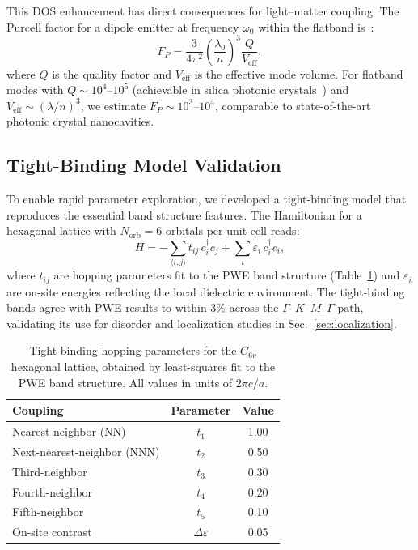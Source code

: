 \documentclass[10pt,letterpaper]{article}
\begin{document}
This DOS enhancement has direct consequences for light--matter coupling. The Purcell factor for a dipole emitter at frequency $\omega_0$ within the flatband is~\cite{Akahane2003}:
\begin{equation}
F_P = \frac{3}{4\pi^2}\left(\frac{\lambda_0}{n}\right)^3 \frac{Q}{V_\mathrm{eff}},
\label{eq:purcell}
\end{equation}
where $Q$ is the quality factor and $V_\mathrm{eff}$ is the effective mode volume. For flatband modes with $Q \sim 10^4$--$10^5$ (achievable in silica photonic crystals~\cite{Akahane2003,Vuckovic2002}) and $V_\mathrm{eff} \sim (\lambda/n)^3$, we estimate $F_P \sim 10^3$--$10^4$, comparable to state-of-the-art photonic crystal nanocavities.

\subsection{Tight-Binding Model Validation}

To enable rapid parameter exploration, we developed a tight-binding model that reproduces the essential band structure features. The Hamiltonian for a hexagonal lattice with $N_\mathrm{orb} = 6$ orbitals per unit cell reads:
\begin{equation}
H = -\sum_{\langle i,j \rangle} t_{ij}\,c_i^\dagger c_j + \sum_i \varepsilon_i\,c_i^\dagger c_i,
\label{eq:tightbinding}
\end{equation}
where $t_{ij}$ are hopping parameters fit to the PWE band structure (Table~\ref{tab:hopping}) and $\varepsilon_i$ are on-site energies reflecting the local dielectric environment. The tight-binding bands agree with PWE results to within 3\% across the $\Gamma$--$K$--$M$--$\Gamma$ path, validating its use for disorder and localization studies in Sec.~\ref{sec:localization}.

\begin{table}[h]
\centering
\caption{Tight-binding hopping parameters for the $C_{6v}$ hexagonal lattice, obtained by least-squares fit to the PWE band structure. All values in units of $2\pi c/a$.}
\label{tab:hopping}
\begin{tabular}{lcc}
\toprule
\textbf{Coupling} & \textbf{Parameter} & \textbf{Value} \\
\midrule
Nearest-neighbor (NN) & $t_1$ & 1.00 \\
Next-nearest-neighbor (NNN) & $t_2$ & 0.50 \\
Third-neighbor & $t_3$ & 0.30 \\
Fourth-neighbor & $t_4$ & 0.20 \\
Fifth-neighbor & $t_5$ & 0.10 \\
On-site contrast & $\Delta\varepsilon$ & 0.05 \\
\bottomrule
\end{tabular}
\end{table}
\end{document}
